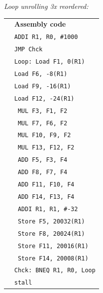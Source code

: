 \documentclass[a4paper, 11pt]{exam}
\begin{document}
\begin{enumerate}
\begin{enumerate}
\hfill
\pagebreak

\textit{Loop unrolling 3x reordered:}

\hfill

\begin{tabular}{ll}
	& \textbf{Assembly code }\\
	&\hspace{40pt}\texttt{ADDI R1, R0, \#1000} \\
	&\hspace{40pt}\texttt{JMP Chck}\\
	&\texttt{Loop: Load F1, 0(R1)} \\
	&\hspace{40pt}\texttt{Load F6, -8(R1)} \\
	&\hspace{40pt}\texttt{Load F9, -16(R1)} \\
	&\hspace{40pt}\texttt{Load F12, -24(R1)} \\
    &\hspace{35pt}\texttt{ MUL F3, F1, F2}\\
    &\hspace{35pt}\texttt{ MUL F7, F6, F2}\\
    &\hspace{35pt}\texttt{ MUL F10, F9, F2}\\
     &\hspace{35pt}\texttt{ MUL F13, F12, F2}\\
	&\hspace{35pt}\texttt{ ADD F5, F3, F4}\\
	&\hspace{35pt}\texttt{ ADD F8, F7, F4}\\
	&\hspace{35pt}\texttt{ ADD F11, F10, F4}\\
	&\hspace{35pt}\texttt{ ADD F14, F13, F4}\\
	&\hspace{35pt}\texttt{ ADDI R1, R1, \#-32}\\
	&\hspace{35pt}\texttt{ Store F5, 20032(R1)}\\
	&\hspace{35pt}\texttt{ Store F8, 20024(R1)}\\
	&\hspace{35pt}\texttt{ Store F11, 20016(R1)}\\
	&\hspace{35pt}\texttt{ Store F14, 20008(R1)}\\
	&\texttt{Chck: BNEQ R1, R0, Loop}\\
	&\hspace{40pt}\texttt{stall}\\
\end{tabular}


\end{enumerate}
\end{enumerate}
\end{document}
